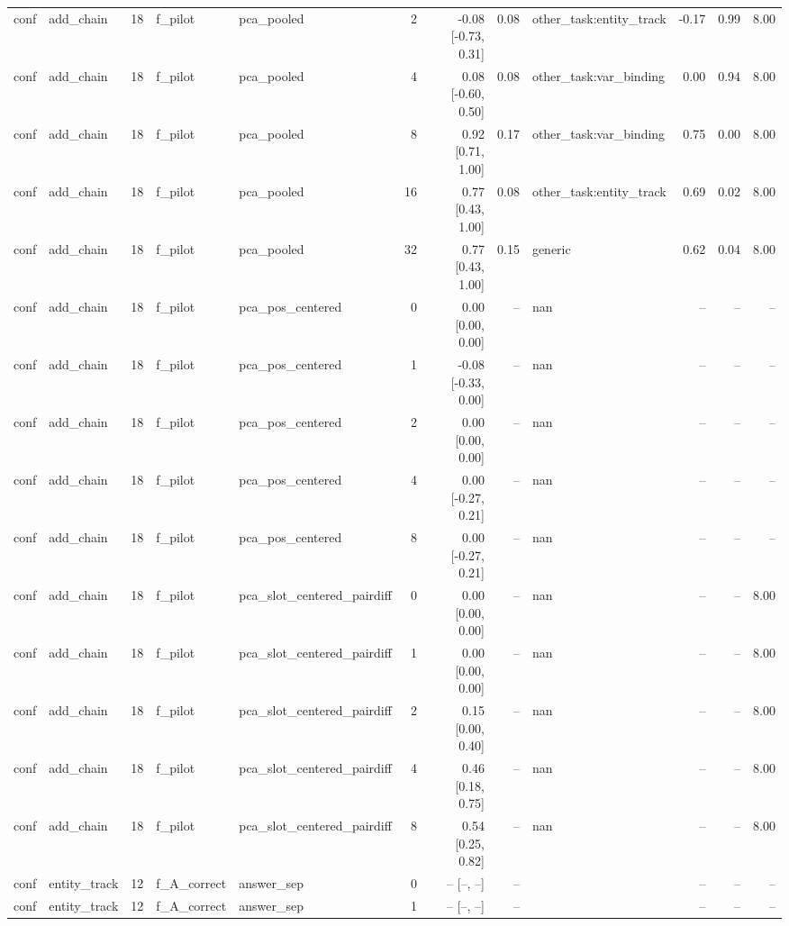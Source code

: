 \begin{tabular}{llrllrrrlrrr}
conf & add\_chain & 18 & f\_pilot & pca\_pooled & 2 & -0.08 [-0.73, 0.31] & 0.08 & other\_task:entity\_track & -0.17 & 0.99 & 8.00 \\
conf & add\_chain & 18 & f\_pilot & pca\_pooled & 4 & 0.08 [-0.60, 0.50] & 0.08 & other\_task:var\_binding & 0.00 & 0.94 & 8.00 \\
conf & add\_chain & 18 & f\_pilot & pca\_pooled & 8 & 0.92 [0.71, 1.00] & 0.17 & other\_task:var\_binding & 0.75 & 0.00 & 8.00 \\
conf & add\_chain & 18 & f\_pilot & pca\_pooled & 16 & 0.77 [0.43, 1.00] & 0.08 & other\_task:entity\_track & 0.69 & 0.02 & 8.00 \\
conf & add\_chain & 18 & f\_pilot & pca\_pooled & 32 & 0.77 [0.43, 1.00] & 0.15 & generic & 0.62 & 0.04 & 8.00 \\
conf & add\_chain & 18 & f\_pilot & pca\_pos\_centered & 0 & 0.00 [0.00, 0.00] & -- & nan & -- & -- & -- \\
conf & add\_chain & 18 & f\_pilot & pca\_pos\_centered & 1 & -0.08 [-0.33, 0.00] & -- & nan & -- & -- & -- \\
conf & add\_chain & 18 & f\_pilot & pca\_pos\_centered & 2 & 0.00 [0.00, 0.00] & -- & nan & -- & -- & -- \\
conf & add\_chain & 18 & f\_pilot & pca\_pos\_centered & 4 & 0.00 [-0.27, 0.21] & -- & nan & -- & -- & -- \\
conf & add\_chain & 18 & f\_pilot & pca\_pos\_centered & 8 & 0.00 [-0.27, 0.21] & -- & nan & -- & -- & -- \\
conf & add\_chain & 18 & f\_pilot & pca\_slot\_centered\_pairdiff & 0 & 0.00 [0.00, 0.00] & -- & nan & -- & -- & 8.00 \\
conf & add\_chain & 18 & f\_pilot & pca\_slot\_centered\_pairdiff & 1 & 0.00 [0.00, 0.00] & -- & nan & -- & -- & 8.00 \\
conf & add\_chain & 18 & f\_pilot & pca\_slot\_centered\_pairdiff & 2 & 0.15 [0.00, 0.40] & -- & nan & -- & -- & 8.00 \\
conf & add\_chain & 18 & f\_pilot & pca\_slot\_centered\_pairdiff & 4 & 0.46 [0.18, 0.75] & -- & nan & -- & -- & 8.00 \\
conf & add\_chain & 18 & f\_pilot & pca\_slot\_centered\_pairdiff & 8 & 0.54 [0.25, 0.82] & -- & nan & -- & -- & 8.00 \\
conf & entity\_track & 12 & f\_A\_correct & answer\_sep & 0 & -- [--, --] & -- &  & -- & -- & -- \\
conf & entity\_track & 12 & f\_A\_correct & answer\_sep & 1 & -- [--, --] & -- &  & -- & -- & -- \\

\end{tabular}
